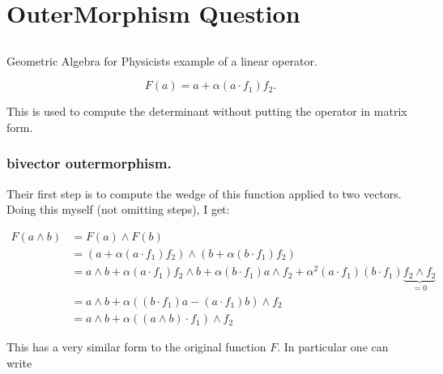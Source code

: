 
%
\chapter{OuterMorphism Question }
\date{ Sept. 2, 2008.  outermorphismDet.tex }

%


\section{}

Geometric Algebra for Physicists example of a linear operator.

\begin{equation}\label{eqn:outermorphism_det:F}
F(a) = a + \alpha(a \cdot f_1) f_2. 
\end{equation} 

This is used to compute the determinant without putting the operator 
in matrix form.

\subsection{bivector outermorphism. }

Their first step is to compute the wedge of this function applied to two vectors.  Doing this myself (not omitting steps), I get:

\begin{align*} 
F(a \wedge b) 
&= F(a) \wedge F(b) \\
&= (a + \alpha(a \cdot f_1) f_2 ) \wedge (b + \alpha(b \cdot f_1) f_2 ) \\
&= a \wedge b + \alpha(a \cdot f_1) f_2 \wedge b
+ \alpha (b \cdot f_1) a \wedge f_2 
+ \alpha^2 (a \cdot f_1) (b \cdot f_1) \underbrace{f_2 \wedge f_2}_{=0} \\
&= a \wedge b 
+ \alpha \left( (b \cdot f_1) a - (a \cdot f_1) b \right) \wedge f_2  
\\
&= a \wedge b 
+ \alpha \left( (a \wedge b ) \cdot f_1 \right) \wedge f_2  
\end{align*} 

This has a very similar form to the original function $F$.  In particular 
one can write 

